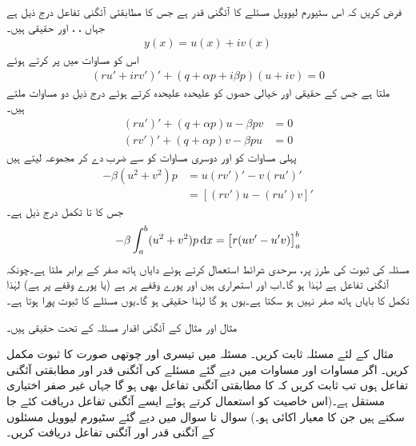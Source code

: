 فرض کریں کہ اس سٹیورم لیوویل مسئلے کا   آئگنی قدر ہے جس کا مطابقتی آئگنی تفاعل درج ذیل ہے جہاں ، ،  اور  حقیقی ہیں۔
\begin{align}
y(x)=u(x)+iv(x)
\end{align} 
اس کو مساوات  میں پر کرتے ہوئے
\begin{align*}
(ru'+irv')'+(q+\alpha p+i\beta p)(u+iv)=0
\end{align*}
ملتا ہے جس کے حقیقی اور  خیالی حصوں کو علیحدہ علیحدہ کرتے ہوئے درج ذیل دو مساوات ملتے ہیں۔
\begin{align*}
(ru')'+(q+\alpha p)u-\beta p v&=0\\
(rv')'+(q+\alpha p)v-\beta p u&=0
\end{align*}
پہلی مساوات کو  اور دوسری مساوات کو  سے ضرب دے کر مجموعہ لیتے ہیں
\begin{align*}
-\beta(u^2+v^2)p&=u(rv')'-v(ru')'\\
&=[(rv')u-(ru')v]'
\end{align*}
جس کا  تا  تکمل درج ذیل ہے۔
\begin{align*}
-\beta \int_a^b (u^2+v^2)p\dif x=\left[r(uv'-u'v)\right]_a^b
\end{align*}
مسئلہ  کی ثبوت کی طرز پر، سرحدی شرائط استعمال کرتے ہوئے دایاں ہاتھ صفر کے برابر ملتا ہے۔چونکہ  آئگنی تفاعل ہے لہٰذا  ہو گا۔اب  اور  استمراری ہیں اور پورے وقفے پر   ہے (یا پورے وقفے پر   ہے) لہٰذا تکمل کا بایاں ہاتھ صفر نہیں ہو سکتا ہے۔یوں  ہو گا لہٰذا   حقیقی ہو گا۔یوں مسئلے کا ثبوت پورا ہوتا ہے۔

مثال  اور مثال  کے آئگنی اقدار مسئلہ  کے تحت حقیقی ہیں۔


مثال  کے لئے مسئلہ   ثابت کریں۔
مسئلہ   میں تیسری اور چوتھی صورت  کا ثبوت مکمل کریں۔
اگر مساوات  اور مساوات  میں دیے گئے مسئلے کی آئگنی قدر  اور مطابقتی آئگنی تفاعل  ہوں تب ثابت کریں کہ  کا مطابقتی آئگنی تفاعل  بھی ہو گا جہاں  غیر صفر اختیاری مستقل ہے۔(اس خاصیت کو استعمال کرتے ہوئے ایسے آئگنی تفاعل دریافت کئے جا سکتے ہیں جن کا معیار اکائی ہو۔)
سوال  تا سوال  میں دیے گئے سٹیورم لیوویل مسئلوں کے آئگنی قدر اور آئگنی تفاعل دریافت کریں۔

